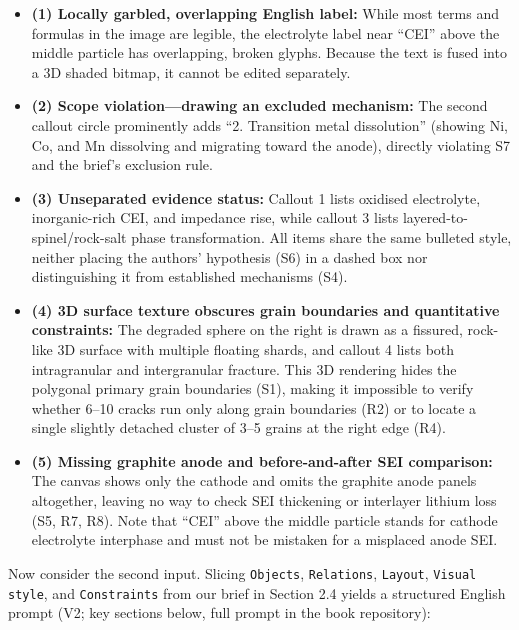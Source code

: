 \begin{itemize}
\item \textbf{(1) Locally garbled, overlapping English label:} While most terms and formulas in the image are legible, the electrolyte label near ``CEI'' above the middle particle has overlapping, broken glyphs. Because the text is fused into a 3D shaded bitmap, it cannot be edited separately.
\item \textbf{(2) Scope violation---drawing an excluded mechanism:} The second callout circle prominently adds ``2. Transition metal dissolution'' (showing Ni, Co, and Mn dissolving and migrating toward the anode), directly violating S7 and the brief's exclusion rule.
\item \textbf{(3) Unseparated evidence status:} Callout 1 lists oxidised electrolyte, inorganic-rich CEI, and impedance rise, while callout 3 lists layered-to-spinel/rock-salt phase transformation. All items share the same bulleted style, neither placing the authors' hypothesis (S6) in a dashed box nor distinguishing it from established mechanisms (S4).
\item \textbf{(4) 3D surface texture obscures grain boundaries and quantitative constraints:} The degraded sphere on the right is drawn as a fissured, rock-like 3D surface with multiple floating shards, and callout 4 lists both intragranular and intergranular fracture. This 3D rendering hides the polygonal primary grain boundaries (S1), making it impossible to verify whether 6--10 cracks run only along grain boundaries (R2) or to locate a single slightly detached cluster of 3--5 grains at the right edge (R4).
\item \textbf{(5) Missing graphite anode and before-and-after SEI comparison:} The canvas shows only the cathode and omits the graphite anode panels altogether, leaving no way to check SEI thickening or interlayer lithium loss (S5, R7, R8). Note that ``CEI'' above the middle particle stands for cathode electrolyte interphase and must not be mistaken for a misplaced anode SEI.
\end{itemize}

Now consider the second input. Slicing \texttt{Objects}, \texttt{Relations}, \texttt{Layout}, \texttt{Visual style}, and \texttt{Constraints} from our brief in Section 2.4 yields a structured English prompt (V2; key sections below, full prompt in the book repository):

